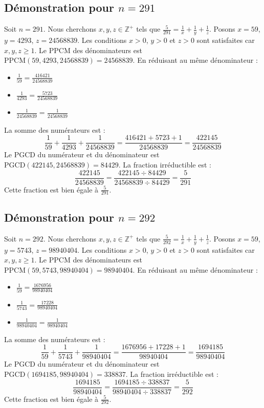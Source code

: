 \documentclass[11pt,a4paper]{article}
\begin{document}
\subsection{Démonstration pour $n = 291$}
Soit $n = 291$. Nous cherchons $x, y, z \in \mathbb{Z}^{+}$ tels que $\frac{5}{291} = \frac{1}{x} + \frac{1}{y} + \frac{1}{z}$.
Posons $x = 59$, $y = 4293$, $z = 24568839$.
Les conditions $x > 0$, $y > 0$ et $z > 0$ sont satisfaites car $x, y, z \geq 1$.
Le PPCM des dénominateurs est $\text{PPCM}(59, 4293, 24568839) = 24568839$.
En réduisant au même dénominateur :
\begin{itemize}
    \item $\frac{1}{59} = \frac{416421}{24568839}$
    \item $\frac{1}{4293} = \frac{5723}{24568839}$
    \item $\frac{1}{24568839} = \frac{1}{24568839}$
\end{itemize}
La somme des numérateurs est :
$$ \frac{1}{59} + \frac{1}{4293} + \frac{1}{24568839} = \frac{416421 + 5723 + 1}{24568839} = \frac{422145}{24568839} $$
Le PGCD du numérateur et du dénominateur est $\text{PGCD}(422145, 24568839) = 84429$.
La fraction irréductible est :
$$ \frac{422145}{24568839} = \frac{422145 \div 84429}{24568839 \div 84429} = \frac{5}{291} $$
Cette fraction est bien égale à $\frac{5}{291}$.

\subsection{Démonstration pour $n = 292$}
Soit $n = 292$. Nous cherchons $x, y, z \in \mathbb{Z}^{+}$ tels que $\frac{5}{292} = \frac{1}{x} + \frac{1}{y} + \frac{1}{z}$.
Posons $x = 59$, $y = 5743$, $z = 98940404$.
Les conditions $x > 0$, $y > 0$ et $z > 0$ sont satisfaites car $x, y, z \geq 1$.
Le PPCM des dénominateurs est $\text{PPCM}(59, 5743, 98940404) = 98940404$.
En réduisant au même dénominateur :
\begin{itemize}
    \item $\frac{1}{59} = \frac{1676956}{98940404}$
    \item $\frac{1}{5743} = \frac{17228}{98940404}$
    \item $\frac{1}{98940404} = \frac{1}{98940404}$
\end{itemize}
La somme des numérateurs est :
$$ \frac{1}{59} + \frac{1}{5743} + \frac{1}{98940404} = \frac{1676956 + 17228 + 1}{98940404} = \frac{1694185}{98940404} $$
Le PGCD du numérateur et du dénominateur est $\text{PGCD}(1694185, 98940404) = 338837$.
La fraction irréductible est :
$$ \frac{1694185}{98940404} = \frac{1694185 \div 338837}{98940404 \div 338837} = \frac{5}{292} $$
Cette fraction est bien égale à $\frac{5}{292}$.
\end{document}
